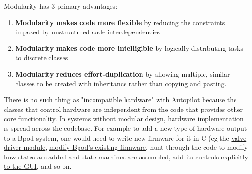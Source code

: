 Modularity has 3 primary advantages:
\begin{enumerate}
    \item \textbf{Modularity} \textbf{makes code more flexible} by reducing the constraints imposed by unstructured code interdependencies
    \item \textbf{Modularity} \textbf{makes code more intelligible} by logically distributing tasks to discrete classes
    \item \textbf{Modularity} \textbf{reduces effort-duplication} by allowing multiple, similar classes to be created with inheritance rather than copying and pasting.
\end{enumerate}

There is no such thing as "incompatible hardware" with Autopilot because the classes that control hardware are independent from the code that provides other core functionality. In systems without modular design, hardware implementation is spread across the codebase. For example to add a new type of hardware output to a Bpod system, one would need to write new firmware for it in C (eg the \href{https://github.com/sanworks/Bpod\_ValveDriver\_Firmware}{valve driver module}, \href{https://github.com/sanworks/Bpod_StateMachine_Firmware/blob/v22/Preconfigured/StateMachine-Bpod2_0/StateMachine-Bpod2_0.ino}{modify Bpod's existing firmware}, hunt through the code to modify how \href{https://github.com/sanworks/Bpod_Gen2/blob/71f3a256b68926b65eae71e10fd747bd28e7ba7d/Functions/State\%20Machine\%20Assembler/AddState.m#L170}{states are added} and \href{https://github.com/sanworks/Bpod_Gen2/blob/71f3a256b68926b65eae71e10fd747bd28e7ba7d/Functions/\%40BpodObject/SetupStateMachine.m#L123}{state machines are assembled}, add its controls explicitly \href{https://github.com/sanworks/Bpod_Gen2/blob/71f3a256b68926b65eae71e10fd747bd28e7ba7d/Functions/Override\%20Panels/StateMachinePanel_2_0_0.m}{to the GUI}, and so on. 

